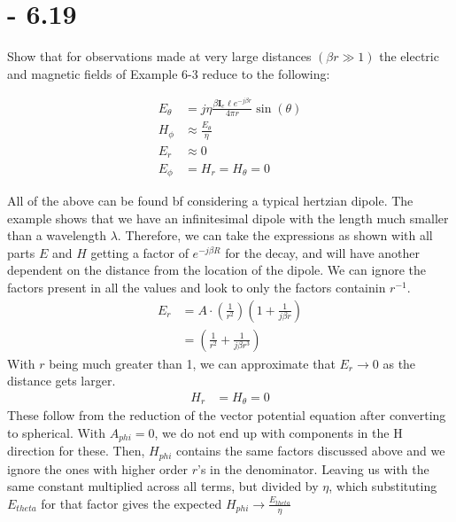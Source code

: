 \documentclass[12pt]{article}
\begin{document}
\section{- 6.19}
Show that for observations made at very large distances $(\beta r \gg 1)$ the electric and magnetic fields of Example 6-3 reduce to the following:
\begin{center}
  \begin{align*}
    E_{\theta} &= j\eta \frac{\beta \bm{I}_e\ell e^{-j\beta r}}{4 \pi r} \sin{(\theta)}\\
    H_{\phi} &\approx \frac{E_{\theta}}{\eta}\\
    E_{r} &\approx 0\\
    E_{\phi} &= H_r = H_{\theta} = 0
  \end{align*}
\end{center}
All of the above can be found bf considering a typical hertzian dipole. The example shows that we have an infinitesimal dipole with the length much smaller than a wavelength $\lambda$. Therefore, we can take the expressions as shown with all parts $E$ and $H$ getting a factor of $e^{-j\beta R}$ for the decay, and will have another dependent on the distance from the location of the dipole. We can ignore the factors present in all the values and look to only the factors containin $r^{-1}$.
\begin{align*}
  E_{r} &= A\cdot \left(\frac{1}{r^2}\right)\left(1 + \frac{1}{j\beta r}\right)\\
  &= \left(\frac{1}{r^2} + \frac{1}{j\beta r^3}\right)
\end{align*}
With $r$ being much greater than 1, we can approximate that $E_r \xrightarrow{} 0$ as the distance gets larger.
\begin{align*}
  H_r &= H_{\theta} = 0
\end{align*}
These follow from the reduction of the vector potential equation after converting to spherical. With $A_{phi} = 0$, we do not end up with components in the H direction for these. Then, $H_{phi}$ contains the same factors discussed above and we ignore the ones with higher order $r$'s in the denominator. Leaving us with the same constant multiplied across all terms, but divided by $\eta$, which substituting $E_{theta}$ for that factor gives the expected $H_{phi} \xrightarrow{} \frac{E_{theta}}{\eta}$
\newpage
\end{document}
